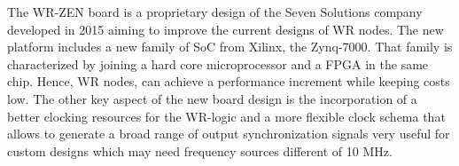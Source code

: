 
The WR-ZEN board is a proprietary design of the Seven 
Solutions company developed in 2015 aiming to improve the current designs of WR nodes.
The new platform includes a new family of SoC from Xilinx, the Zynq-7000. That family is characterized by joining a hard core microprocessor and a FPGA in the same chip. Hence, WR nodes, can achieve a performance increment while keeping costs low. The other key aspect of the new board design is the incorporation of a better clocking resources for the WR-logic and a more flexible clock schema that allows to generate a broad range of output synchronization signals very useful for custom designs which may need frequency sources different of 10 MHz.


